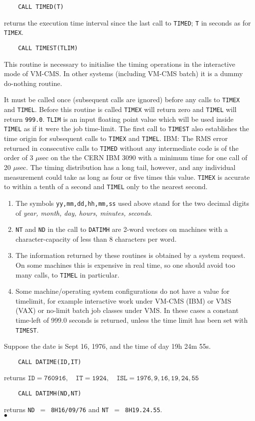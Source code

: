 \begin{verbatim}
    CALL TIMED(T)
\end{verbatim}
returns the execution time interval since the last call to {\tt TIMED};
{\tt T} in seconds as for {\tt TIMEX}.
\newpage
\begin{verbatim}
    CALL TIMEST(TLIM)
\end{verbatim}
This routine is necessary to initialise the timing operations
in the interactive mode of VM-CMS. In other systems (including VM-CMS
batch) it is a dummy do-nothing routine.
\par
It must be called once (subsequent calls are ignored) before any
calls to {\tt TIMEX} and {\tt TIMEL}. Before this routine is called
{\tt TIMEX} will return zero and {\tt TIMEL} will return {\tt 999.0}.
{\tt TLIM} is an input floating point value which will be used inside
{\tt TIMEL} as if it were the job time-limit. The first call to
{\tt TIMEST} also establishes the time origin for subsequent calls to
{\tt TIMEX} and {\tt TIMEL}.
\Accuracy
IBM: The RMS error returned in consecutive calls to {\tt TIMED}
without any intermediate code is of the order of 3 $\mu$sec on the
the CERN IBM 3090 with a minimum time for one call of 20 $\mu$sec.
The timing distribution has a long tail, however, and any individual
measurement could take as long as four or five times this value.
{\tt TIMEX} is accurate to within a tenth of a second and {\tt TIMEL}
only to the nearest second.
\Notes
\begin{enumerate}
\item The symbols {\tt yy,mm,dd,hh,mm,ss} used above stand
for the two decimal digits of {\it year, month, day, hours, minutes,
seconds}.
\item {\tt NT} and {\tt ND} in the call to {\tt DATIMH} are
2-word vectors on machines with a character-capacity of less than 8
characters per word.
\item  The information returned by these routines is obtained
by a system request. On some machines this is expensive in real time,
so one should avoid too many calls, to {\tt TIMEL} in particular.
\item Some machine/operating system configurations do not have a
value for timelimit, for example interactive work under VM-CMS (IBM) or
VMS (VAX) or no-limit batch job classes under VMS. In these cases a
constant time-left of 999.0 seconds is returned,
unless the time limit has been set with {\tt TIMEST}.
\end{enumerate}
\Examples
Suppose the date is Sept 16, 1976, and the time of day 19h 24m 55s.
\begin{verbatim}
    CALL DATIME(ID,IT)
\end{verbatim}
returns $\mathtt{ID = 760916, \quad IT = 1924, \quad
ISL = 1976, 9, 16, 19, 24, 55}$
\begin{verbatim}
    CALL DATIMH(ND,NT)
\end{verbatim}
returns {\tt ND $=$ 8H16/09/76} and {\tt NT $=$ 8H19.24.55}.
\\ $\bullet$
